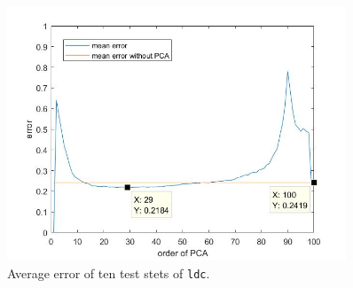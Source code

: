\begin{figure}[H]
	\centering
	\includegraphics[width = 0.9\textwidth]{images/dissim_ldc_mean.jpg}
	\caption{Average error of ten test stets of \texttt{ldc}.}
	\label{fig:dissim_ldc_mean}
\end{figure}


